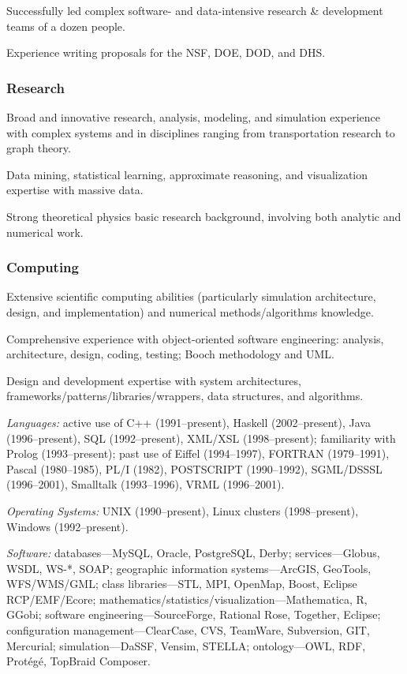 \documentclass[]{article}
\begin{document}
Successfully led complex software- and data-intensive research \&
development teams of a dozen people.

Experience writing proposals for the NSF, DOE, DOD, and DHS.

\subsubsection{Research}\label{research}

Broad and innovative research, analysis, modeling, and simulation
experience with complex systems and in disciplines ranging from
transportation research to graph theory.

Data mining, statistical learning, approximate reasoning, and
visualization expertise with massive data.

Strong theoretical physics basic research background, involving both
analytic and numerical work.

\subsubsection{Computing}\label{computing}

Extensive scientific computing abilities (particularly simulation
architecture, design, and implementation) and numerical
methods/algorithms knowledge.

Comprehensive experience with object-oriented software engineering:
analysis, architecture, design, coding, testing; Booch methodology and
UML.

Design and development expertise with system architectures,
frameworks/patterns/libraries/wrappers, data structures, and algorithms.

\emph{Languages:} active use of C++ (1991--present), Haskell
(2002--present), Java (1996--present), SQL (1992--present), XML/XSL
(1998--present); familiarity with Prolog (1993--present); past use of
Eiffel (1994--1997), FORTRAN (1979--1991), Pascal (1980--1985), PL/I
(1982), POSTSCRIPT (1990--1992), SGML/DSSSL (1996--2001), Smalltalk
(1993--1996), VRML (1996--2001).

\emph{Operating Systems:} UNIX (1990--present), Linux clusters
(1998--present), Windows (1992--present).

\emph{Software:} databases---MySQL, Oracle, PostgreSQL, Derby;
services---Globus, WSDL, WS-*, SOAP; geographic information
systems---ArcGIS, GeoTools, WFS/WMS/GML; class libraries---STL, MPI,
OpenMap, Boost, Eclipse RCP/EMF/Ecore;
mathematics/statistics/visualization---Mathematica, R, GGobi; software
engineering---SourceForge, Rational Rose, Together, Eclipse;
configuration management---ClearCase, CVS, TeamWare, Subversion, GIT,
Mercurial; simulation---DaSSF, Vensim, STELLA; ontology---OWL, RDF,
Protégé, TopBraid Composer.
\end{document}
